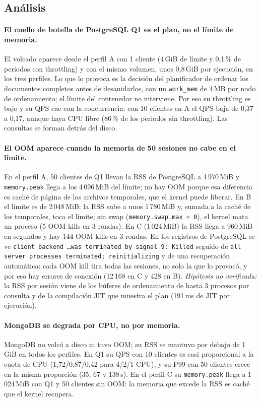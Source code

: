 \documentclass[11pt,a4paper]{article}
\newcommand{\cod}[1]{\texttt{#1}}
\begin{document}
\subsection{Análisis}

\paragraph{El cuello de botella de PostgreSQL Q1 es el plan, no el límite de memoria.} El
volcado aparece desde el perfil A con 1 cliente (4\,GiB de límite y 0,1\,\% de periodos
con throttling) y con el mismo volumen, unos 0,8\,GiB por ejecución, en los tres perfiles.
Lo que lo provoca es la decisión del planificador de ordenar los documentos completos
antes de desanidarlos, con un \cod{work\_mem} de 4\,MB por nodo de ordenamiento; el límite
del contenedor no interviene. Por eso su throttling es bajo y su QPS cae con la
concurrencia: con 10 clientes en A el QPS baja de 0,37 a 0,17, aunque haya CPU libre
(86\,\% de los periodos sin throttling). Las consultas se forman detrás del disco.

\paragraph{El OOM aparece cuando la memoria de 50 sesiones no cabe en el límite.} En el
perfil A, 50 clientes de Q1 llevan la RSS de PostgreSQL a 1\,970\,MiB y
\cod{memory.peak} llega a los 4\,096\,MiB del límite; no hay OOM porque esa diferencia es
caché de página de los archivos temporales, que el kernel puede liberar. En B el límite es
de 2\,048\,MiB: la RSS sube a unos 1\,780\,MiB y, sumada a la caché de los temporales,
toca el límite; sin swap (\cod{memory.swap.max = 0}), el kernel mata un proceso
(5 OOM kills en 3 rondas). En C (1\,024\,MiB) la RSS llega a 960\,MiB en segundos y hay
144 OOM kills en 3 rondas. En los registros de PostgreSQL se ve
\cod{client backend \ldots was terminated by signal 9: Killed} seguido de
\cod{all server processes terminated; reinitializing} y de una recuperación automática:
cada OOM kill tira todas las sesiones, no solo la que lo provocó, y por eso hay errores
de conexión (12\,168 en C y 428 en B). \emph{Hipótesis no verificada:} la RSS por sesión
viene de los búferes de ordenamiento de hasta 3 procesos por consulta y de la compilación
JIT que muestra el plan (191\,ms de JIT por ejecución).

\paragraph{MongoDB se degrada por CPU, no por memoria.} MongoDB no volcó a disco ni tuvo
OOM; su RSS se mantuvo por debajo de 1\,GiB en todos los perfiles. En Q1 su QPS con 10
clientes es casi proporcional a la cuota de CPU (1,72/0,87/0,42 para 4/2/1 CPU), y su P99
con 50 clientes crece en la misma proporción (35, 67 y 138\,s). En el perfil C su
\cod{memory.peak} llega a 1\,024\,MiB con Q1 y 50 clientes sin OOM: la memoria que
excede la RSS es caché que el kernel recupera.
\end{document}
